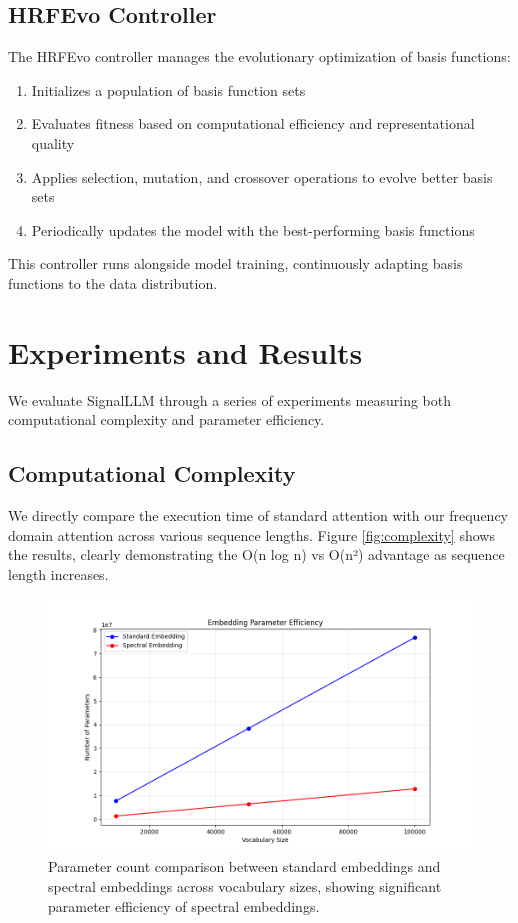 \documentclass[10pt,twocolumn,letterpaper]{article}
\begin{document}
\subsection{HRFEvo Controller}

The HRFEvo controller manages the evolutionary optimization of basis functions:

\begin{enumerate}
    \item Initializes a population of basis function sets
    \item Evaluates fitness based on computational efficiency and representational quality
    \item Applies selection, mutation, and crossover operations to evolve better basis sets
    \item Periodically updates the model with the best-performing basis functions
\end{enumerate}

This controller runs alongside model training, continuously adapting basis functions to the data distribution.

\section{Experiments and Results}

We evaluate SignalLLM through a series of experiments measuring both computational complexity and parameter efficiency.

\subsection{Computational Complexity}

We directly compare the execution time of standard attention with our frequency domain attention across various sequence lengths. Figure \ref{fig:complexity} shows the results, clearly demonstrating the O(n log n) vs O(n²) advantage as sequence length increases.

\begin{figure}[t]
    \centering
    \includegraphics[width=0.9\linewidth]{report_assets/embedding_efficiency.png}
    \caption{Parameter count comparison between standard embeddings and spectral embeddings across vocabulary sizes, showing significant parameter efficiency of spectral embeddings.}
    \label{fig:embedding}
\end{figure}
\end{document}
